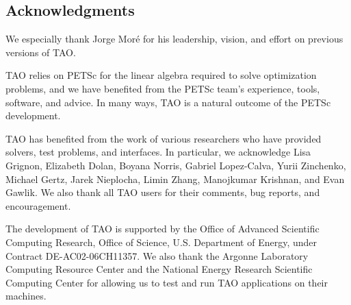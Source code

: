 %
%

\subsection*{Acknowledgments}

We especially thank Jorge Mor\'e for his leadership, vision, and effort on 
previous versions of TAO.  

TAO relies on PETSc for the linear algebra required to solve optimization
problems, and we have benefited from the PETSc team's experience, tools, 
software, 
and advice. In many ways, TAO is a natural outcome of the PETSc 
development.  

TAO has benefited from the work of various researchers who have provided 
solvers, test problems, and interfaces.  In particular, we acknowledge Lisa 
Grignon, Elizabeth Dolan, Boyana Norris, Gabriel Lopez-Calva, Yurii Zinchenko, 
Michael Gertz, Jarek Nieplocha, Limin Zhang, Manojkumar Krishnan, and Evan 
Gawlik.  We also thank all TAO users for their comments, bug reports, and 
encouragement.

The development of TAO is supported by the Office of Advanced Scientific 
Computing Research, Office of Science, U.S. Department of Energy, under 
Contract DE-AC02-06CH11357.  We also thank the Argonne Laboratory Computing 
Resource Center and the National Energy Research Scientific Computing Center 
for allowing us to test and run TAO applications on their machines.

